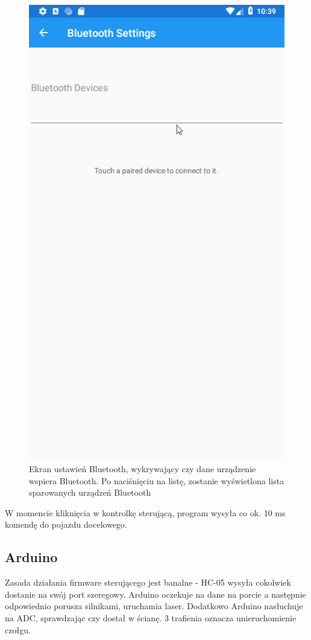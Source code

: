 \documentclass{report}
\begin{document}
		\begin{figure}[H]
			\centering            
			\includegraphics[scale=0.6]{android_2.png}
			\caption{Ekran ustawień Bluetooth, wykrywający czy dane urządzenie wspiera Bluetooth. Po naciśnięciu na listę, zostanie wyświetlona lista sparowanych urządzeń Bluetooth}
		\end{figure}
		W momencie kliknięcia w kontrolkę sterującą, program wysyła co ok. 10 ms komendę do pojazdu docelowego.
	\subsection{Arduino}
	Zasada działania firmware sterującego jest banalne - HC-05 wysyła cokolwiek dostanie na swój port szeregowy. Arduino oczekuje na dane na porcie a następnie odpowiednio porusza silnikami, uruchamia laser.
	Dodatkowo Arduino nasłuchuje na ADC, sprawdzając czy dostał w ścianę. 3 trafienia oznacza unieruchomienie czołgu.
\end{document}
